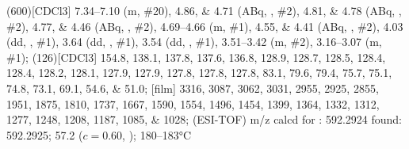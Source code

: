 \begin{fullexp}
	\NMR(600)[CDCl3] \numrange{7.34}{7.10} (m, \#{20}), \numlist{4.86;4.71} (ABq, , \#{2}), \numlist{4.81;4.78} (ABq, , \#{2}), \numlist{4.77;4.46} (ABq, , \#{2}), \numrange{4.69}{4.66} (m, \#{1}), \numlist{4.55;4.41} (ABq, , \#{2}), \num{4.03} (dd, , \#{1}), \num{3.64} (dd, , \#{1}), \num{3.54} (dd, , \#{1}), \numrange{3.51}{3.42} (m, \#{2}), \numrange{3.16}{3.07} (m, \#{1});
	(126)[CDCl3] \numlist{154.8; 138.1; 137.8; 137.6; 136.8; 128.9; 128.7; 128.5; 128.4; 128.4; 128.2; 128.1; 127.9; 127.9; 127.8; 127.8; 127.8; 83.1; 79.6; 79.4; 75.7; 75.1; 74.8; 73.1; 69.1; 54.6; 51.0};
	[film] \numlist{3316; 3087; 3062; 3031; 2955; 2925; 2855; 1951; 1875; 1810; 1737; 1667; 1590; 1554; 1496; 1454; 1399; 1364; 1332; 1312; 1277; 1248; 1208; 1187; 1085; 1028};
	 (ESI-TOF) m/z calcd for : \num{592.2924} found: \num{592.2925};
	\data{[$\alpha^{23}_D$]~$=$} \num{57.2} ($c = 0.60$, );
	 \numrange{180}{183}\si{\celsius}
\end{fullexp}
